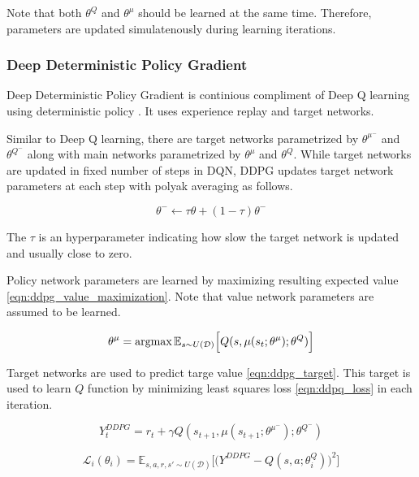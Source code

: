 Note that both $\theta^Q$ and $\theta^\mu$ should be learned at the same time. Therefore, parameters are updated simulatenously during learning iterations.

\subsubsection{Deep Deterministic Policy Gradient}
Deep Deterministic Policy Gradient is continious compliment of Deep Q learning using deterministic policy \cite{lillicrap_continuous_2019}. It uses experience replay and target networks.  

Similar to Deep Q learning, there are target networks parametrized by $\theta^{\mu^-}$ and $\theta^{Q^-}$ along with main networks parametrized by $\theta^{\mu}$ and $\theta^{Q}$. While target networks are updated in fixed number of steps in DQN, DDPG updates target network parameters at each step with polyak averaging as follows.

\begin{equation}
\label{eqn:target_update}
\theta^- \leftarrow \tau \theta + (1-\tau) \theta^-
\end{equation}

The $\tau$ is an hyperparameter indicating how slow the target network is updated and usually close to zero.

Policy network parameters are learned by maximizing resulting expected value \ref{eqn:ddpg_value_maximization}. Note that value network parameters are assumed to be learned.

\begin{equation}
\label{eqn:ddpg_value_maximization}
\theta^\mu = \operatorname{\textup{argmax}} \mathbb{E}_{s \sim U(\mathcal{D})} \Big[ Q(s, \mu(s_t;\theta^\mu);\theta^Q) \Big]
\end{equation}
 
Target networks are used to predict targe value \ref{eqn:ddpg_target}. This target is used to learn $Q$ function by minimizing least squares loss \ref{eqn:ddpq_loss} in each iteration.

\begin{equation}
\label{eqn:ddpg_target}
Y_t^{DDPG} = r_t + \gamma Q(s_{t+1}, \mu(s_{t+1};\theta^{\mu^-});\theta^{Q^-})
\end{equation}

\begin{equation}
\label{eqn:ddpg_loss}
\mathcal{L}_i(\theta_i) = \mathbb{E}_{s,a,r,s'\sim U(\mathcal{D})}\Big[\big( Y^{DDPG} - Q(s,a;\theta^Q_i) \big) ^ 2 \Big]
\end{equation}

